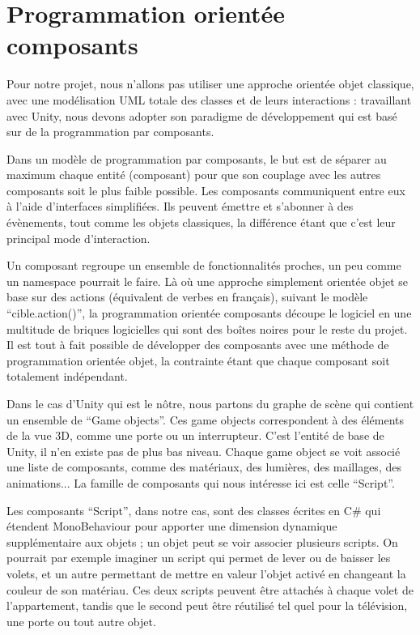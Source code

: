 \section{Programmation orientée composants}

Pour notre projet, nous n'allons pas utiliser une approche orientée objet classique, avec une modélisation UML totale des classes et de leurs interactions : travaillant avec Unity, nous devons adopter son paradigme de développement qui est basé sur de la programmation par composants.\newline

Dans un modèle de programmation par composants, le but est de séparer au maximum chaque entité (composant) pour que son couplage avec les autres composants soit le plus faible possible. Les composants communiquent entre eux à l'aide d'interfaces simplifiées. Ils peuvent émettre et s'abonner à des évènements, tout comme les objets classiques, la différence étant que c'est leur principal mode d'interaction.\newline

Un composant regroupe un ensemble de fonctionnalités proches, un peu comme un namespace pourrait le faire. Là où une approche simplement orientée objet se base sur des actions (équivalent de verbes en français), suivant le modèle \enquote{cible.action()}, la programmation orientée composants découpe le logiciel en une multitude de briques logicielles qui sont des boîtes noires pour le reste du projet. Il est tout à fait possible de développer des composants avec une méthode de programmation orientée objet, la contrainte étant que chaque composant soit totalement indépendant.\newline

Dans le cas d'Unity qui est le nôtre, nous partons du graphe de scène qui contient un ensemble de \enquote{Game objects}. Ces game objects correspondent à des éléments de la vue 3D, comme une porte ou un interrupteur. C'est l'entité de base de Unity, il n'en existe pas de plus bas niveau. Chaque game object se voit associé une liste de composants, comme des matériaux, des lumières, des maillages, des animations... La famille de composants qui nous intéresse ici est celle \enquote{Script}.\newline

Les composants \enquote{Script}, dans notre cas, sont des classes écrites en C\# qui étendent MonoBehaviour pour apporter une dimension dynamique supplémentaire aux objets ; un objet peut se voir associer plusieurs scripts. On pourrait par exemple imaginer un script qui permet de lever ou de baisser les volets, et un autre permettant de mettre en valeur l'objet activé en changeant la couleur de son matériau. Ces deux scripts peuvent être attachés à chaque volet de l'appartement, tandis que le second peut être réutilisé tel quel pour la télévision, une porte ou tout autre objet.\newline

